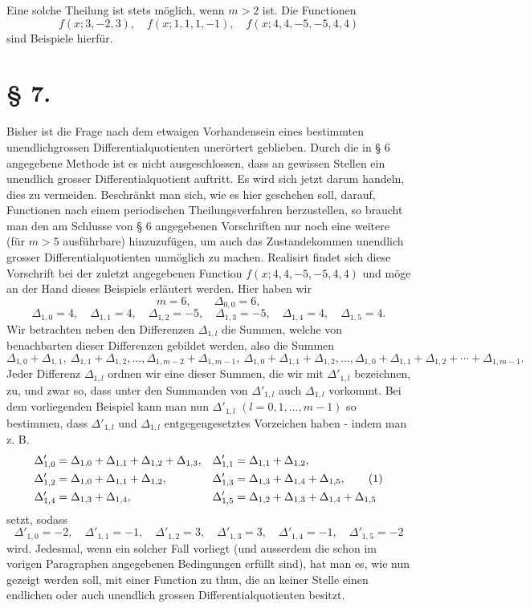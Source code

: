 Eine solche Theilung ist stets möglich, wenn $m>2$ ist. Die Functionen
\[
 f(x;3,-2,3),\quad f(x;1,1,1,-1),\quad f(x;4,4,-5,-5,4,4)
\]
sind Beispiele hierfür.

\section*{§ 7.}

Bisher ist die Frage nach dem etwaigen Vorhandensein eines bestimmten unendlichgrossen Differentialquotienten unerörtert geblieben. Durch die in § 6 angegebene Methode ist es nicht ausgeschlossen, dass an gewissen Stellen ein unendlich grosser Differentialquotient auftritt. Es wird sich jetzt darum handeln, dies zu vermeiden. Beschränkt man sich, wie es hier geschehen soll, darauf, Functionen nach einem periodischen Theilungsverfahren herzustellen, so braucht man den am Schlusse von § 6 angegebenen Vorschriften nur noch eine weitere (für $m>5$ ausführbare) hinzuzufügen, um auch das Zustandekommen unendlich grosser Differentialquotienten unmöglich zu machen. Realisirt findet sich diese Vorschrift bei der zuletzt angegebenen Function $f(x;4,4,-5,-5,4,4)$ und möge an der Hand dieses Beispiels erläutert werden. Hier haben wir
\[
 m=6,
 \qquad
 \Delta_{0,0}=6,
\]
\[
 \Delta_{1,0}=4,\quad \Delta_{1,1}=4,\quad \Delta_{1,2}=-5,
 \quad \Delta_{1,3}=-5,
 \quad \Delta_{1,4}=4,
 \quad \Delta_{1,5}=4.
\]
Wir betrachten neben den Differenzen $\Delta_{1,l}$ die Summen, welche von benachbarten dieser Differenzen gebildet werden, also die Summen
\[
 \Delta_{1,0}+\Delta_{1,1},\ \Delta_{1,1}+\Delta_{1,2},\ldots,
 \Delta_{1,m-2}+\Delta_{1,m-1},\
 \Delta_{1,0}+\Delta_{1,1}+\Delta_{1,2},\ldots,
 \Delta_{1,0}+\Delta_{1,1}+\Delta_{1,2}+\cdots+\Delta_{1,m-1}.
\]
Jeder Differenz $\Delta_{1,l}$ ordnen wir eine dieser Summen, die wir mit $\Delta'_{1,l}$ bezeichnen, zu, und zwar so, dass unter den Summanden von $\Delta'_{1,l}$ auch $\Delta_{1,l}$ vorkommt. Bei dem vorliegenden Beispiel kann man nun $\Delta'_{1,l}$ $(l=0,1,\ldots,m-1)$ so bestimmen, dass $\Delta'_{1,l}$ und $\Delta_{1,l}$ entgegengesetztes Vorzeichen haben - indem man z. B.
\begin{align}
 \Delta'_{1,0}&=\Delta_{1,0}+\Delta_{1,1}+\Delta_{1,2}+\Delta_{1,3},
 &\Delta'_{1,1}&=\Delta_{1,1}+\Delta_{1,2},\notag\\
 \Delta'_{1,2}&=\Delta_{1,0}+\Delta_{1,1}+\Delta_{1,2},
 &\Delta'_{1,3}&=\Delta_{1,3}+\Delta_{1,4}+\Delta_{1,5},\tag{1}\\
 \Delta'_{1,4}&=\Delta_{1,3}+\Delta_{1,4},
 &\Delta'_{1,5}&=\Delta_{1,2}+\Delta_{1,3}+\Delta_{1,4}+\Delta_{1,5}
\notag
\end{align}
setzt, sodass
\[
 \Delta'_{1,0}=-2,
 \quad \Delta'_{1,1}=-1,
 \quad \Delta'_{1,2}=3,
 \quad \Delta'_{1,3}=3,
 \quad \Delta'_{1,4}=-1,
 \quad \Delta'_{1,5}=-2
\]
wird. Jedesmal, wenn ein solcher Fall vorliegt (und ausserdem die schon im vorigen Paragraphen angegebenen Bedingungen erfüllt sind), hat man es, wie nun gezeigt werden soll, mit einer Function zu thun, die an keiner Stelle einen endlichen oder auch unendlich grossen Differentialquotienten besitzt.

